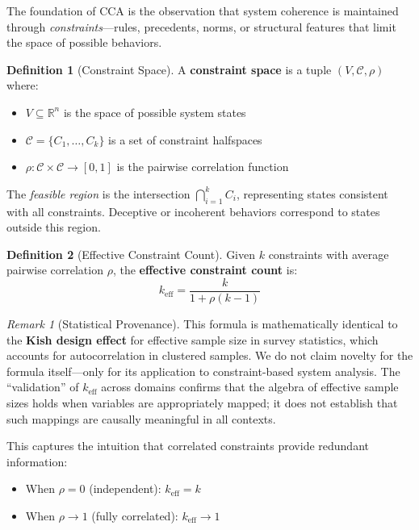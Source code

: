 \documentclass[11pt,a4paper]{article}
\theoremstyle{definition}
\newtheorem{definition}{Definition}[section]
\theoremstyle{remark}
\newtheorem{remark}{Remark}[section]
\newcommand{\keff}{k_{\text{eff}}}
\newcommand{\R}{\mathbb{R}}
\begin{document}
The foundation of CCA is the observation that system coherence is maintained through \textit{constraints}---rules, precedents, norms, or structural features that limit the space of possible behaviors.

\begin{definition}[Constraint Space]
A \textbf{constraint space} is a tuple $(V, \mathcal{C}, \rho)$ where:
\begin{itemize}[noitemsep]
    \item $V \subseteq \R^n$ is the space of possible system states
    \item $\mathcal{C} = \{C_1, \ldots, C_k\}$ is a set of constraint halfspaces
    \item $\rho: \mathcal{C} \times \mathcal{C} \to [0,1]$ is the pairwise correlation function
\end{itemize}
\end{definition}

The \textit{feasible region} is the intersection $\bigcap_{i=1}^{k} C_i$, representing states consistent with all constraints. Deceptive or incoherent behaviors correspond to states outside this region.

\begin{definition}[Effective Constraint Count]
Given $k$ constraints with average pairwise correlation $\rho$, the \textbf{effective constraint count} is:
\begin{equation}
\keff = \frac{k}{1 + \rho(k-1)}
\label{eq:keff}
\end{equation}
\end{definition}

\begin{remark}[Statistical Provenance]
This formula is mathematically identical to the \textbf{Kish design effect} for effective sample size in survey statistics, which accounts for autocorrelation in clustered samples. We do not claim novelty for the formula itself---only for its application to constraint-based system analysis. The ``validation'' of $\keff$ across domains confirms that the algebra of effective sample sizes holds when variables are appropriately mapped; it does not establish that such mappings are causally meaningful in all contexts.
\end{remark}

This captures the intuition that correlated constraints provide redundant information:
\begin{itemize}[noitemsep]
    \item When $\rho = 0$ (independent): $\keff = k$
    \item When $\rho \to 1$ (fully correlated): $\keff \to 1$
\end{itemize}
\end{document}

